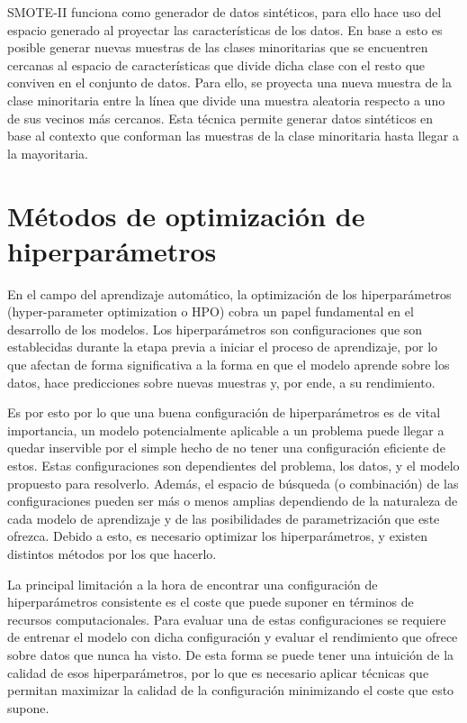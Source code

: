 \documentclass{uathesis-es}
\begin{document}
{	SMOTE-II funciona como generador de datos sintéticos, para ello hace uso del espacio generado al proyectar las características de los datos. En base a esto es posible generar nuevas muestras de las clases minoritarias que se encuentren cercanas al espacio de características que divide dicha clase con el resto que conviven en el conjunto de datos. Para ello, se proyecta una nueva muestra de la clase minoritaria entre la línea que divide una muestra aleatoria respecto a uno de sus vecinos más cercanos. Esta técnica permite generar datos sintéticos en base al contexto que conforman las muestras de la clase minoritaria hasta llegar a la mayoritaria.
	
	
	\section{Métodos de optimización de hiperparámetros}
	\label{HYPERPARAMETERS_OPTIMIZATION_METHODS}
	
	En el campo del aprendizaje automático, la optimización de los hiperparámetros (hyper-parameter optimization o HPO) cobra un papel fundamental en el desarrollo de los modelos. Los hiperparámetros son configuraciones que son establecidas durante la etapa previa a iniciar el proceso de aprendizaje, por lo que afectan de forma significativa a la forma en que el modelo aprende sobre los datos, hace predicciones sobre nuevas muestras y, por ende, a su rendimiento.
	
	Es por esto por lo que una buena configuración de hiperparámetros es de vital importancia, un modelo potencialmente aplicable a un problema puede llegar a quedar inservible por el simple hecho de no tener una configuración eficiente de estos. Estas configuraciones son dependientes del problema, los datos, y el modelo propuesto para resolverlo. Además, el espacio de búsqueda (o combinación) de las configuraciones pueden ser más o menos amplias dependiendo de la naturaleza de cada modelo de aprendizaje y de las posibilidades de parametrización que este ofrezca. Debido a esto, es necesario optimizar los hiperparámetros, y existen distintos métodos por los que hacerlo.
	
	La principal limitación a la hora de encontrar una configuración de hiperparámetros consistente es el coste que puede suponer en términos de recursos computacionales. Para evaluar una de estas configuraciones se requiere de entrenar el modelo con dicha configuración y evaluar el rendimiento que ofrece sobre datos que nunca ha visto. De esta forma se puede tener una intuición de la calidad de esos hiperparámetros, por lo que es necesario aplicar técnicas que permitan maximizar la calidad de la configuración minimizando el coste que esto supone.
	
}
\end{document}
